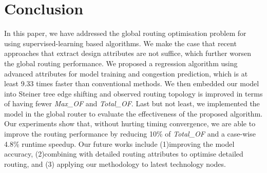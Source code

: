 \section{Conclusion}
In this paper, we have addressed the global routing optimisation problem for using supervised-learning based algorithms. We make the case that recent approaches that extract design attributes are not suffice, which further worsen the global routing performance. We proposed a regression algorithm using advanced attributes for model training and congestion prediction, which is at least 9.33 times faster than conventional methods. We then embedded our model into Steiner tree edge shifting and observed routing topology is improved in terms of having fewer \textit{Max\_OF} and \textit{Total\_OF}. Last but not least, we implemented the model in the global router to evaluate the effectiveness of the proposed algorithm. Our experiments show that, without hurting timing convergence, we are able to improve the routing performance by reducing 10\% of \textit{Total\_OF} and a case-wise 4.8\% runtime speedup. Our future works include (1)improving the model accuracy, (2)combining with detailed routing attributes to optimise detailed routing, and (3) applying our methodology to latest technology nodes.